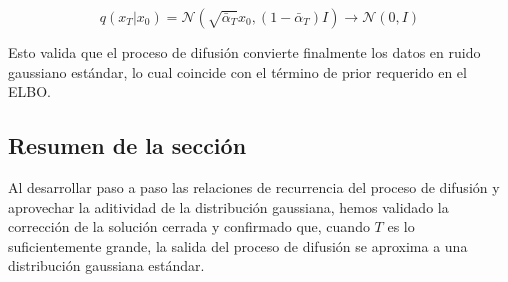 $$q(x_T | x_0) = \mathcal{N}(\sqrt{\bar{\alpha}_T} x_0, (1-\bar{\alpha}_T)I) \to \mathcal{N}(0, I)$$

Esto valida que el proceso de difusión convierte finalmente los datos en ruido gaussiano estándar, lo cual coincide con el término de prior requerido en el ELBO.

\subsection{Resumen de la sección}

Al desarrollar paso a paso las relaciones de recurrencia del proceso de difusión y aprovechar la aditividad de la distribución gaussiana, hemos validado la corrección de la solución cerrada y confirmado que, cuando $T$ es lo suficientemente grande, la salida del proceso de difusión se aproxima a una distribución gaussiana estándar.
